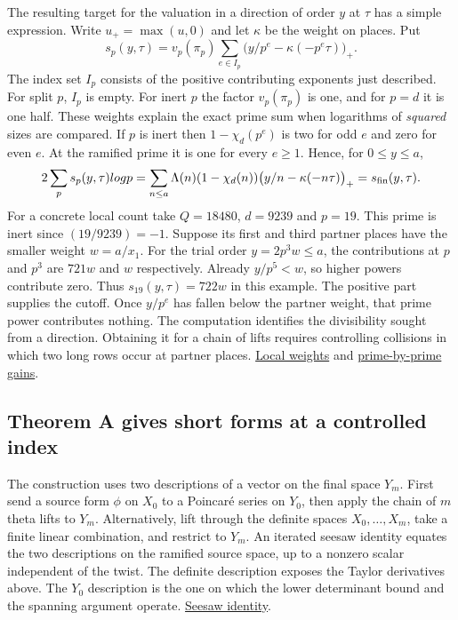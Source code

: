 \documentclass[11pt,letterpaper]{article}
\newcommand{\sref}[2]{\href{https://github.com/VladimirReshetnikov/ProveIt/blob/d8415e76ad850651f8c0083afe689dd9f4a45a10/Analysis/GeneralizedRiemannHypothesis/vendor/grh-lean/grh/src/#1.lean}{#2}}
\newcommand{\upperref}[2]{\sref{#1}{#2}}
\begin{document}
The resulting target for the valuation in a direction of order $y$ at $\tau$ has a simple expression. Write $u_+=\max(u,0)$ and let $\kappa$ be the weight on places. Put
\[
 s_p(y,\tau)=v_p(\pi_p)\sum_{e\in I_p}
             \bigl(y/p^e-\kappa(-p^e\tau)\bigr)_+.
\]
The index set $I_p$ consists of the positive contributing exponents just described. For split $p$, $I_p$ is empty. For inert $p$ the factor $v_p(\pi_p)$ is one, and for $p=d$ it is one half. These weights explain the exact prime sum when logarithms of \emph{squared} sizes are compared. If $p$ is inert then $1-\chi_d(p^e)$ is two for odd $e$ and zero for even $e$. At the ramified prime it is one for every $e\geq1$. Hence, for $0\leq y\leq a$,
\[
  2\sum_{p} s_p(y,\tau)\log p
  =\sum_{n\leq a}\Lambda(n)(1-\chi_d(n))
                  \bigl(y/n-\kappa(-n\tau)\bigr)_+
  =s_{\rm fin}(y,\tau).
\]
For a concrete local count take $Q=18480$, $d=9239$ and $p=19$. This prime is inert since $(19/9239)=-1$. Suppose its first and third partner places have the smaller weight $w=a/x_1$. For the trial order $y=2p^3w\le a$, the contributions at $p$ and $p^3$ are $721w$ and $w$ respectively. Already $y/p^5<w$, so higher powers contribute zero. Thus $s_{19}(y,\tau)=722w$ in this example. The positive part supplies the cutoff. Once $y/p^e$ has fallen below the partner weight, that prime power contributes nothing. The computation identifies the divisibility sought from a direction. Obtaining it for a chain of lifts requires controlling collisions in which two long rows occur at partner places. \upperref{Lib/CM/FormalGroup/PrimeNotation}{Local weights} and \upperref{New/UpperBound/Size/ShortColumns}{prime-by-prime gains}.

\subsection{Theorem A gives short forms at a controlled index}

The construction uses two descriptions of a vector on the final space $Y_m$. First send a source form $\phi$ on $X_0$ to a Poincar\'e series on $Y_0$, then apply the chain of $m$ theta lifts to $Y_m$. Alternatively, lift through the definite spaces $X_0,\ldots,X_m$, take a finite linear combination, and restrict to $Y_m$. An iterated seesaw identity equates the two descriptions on the ramified source space, up to a nonzero scalar independent of the twist. The definite description exposes the Taylor derivatives above. The $Y_0$ description is the one on which the lower determinant bound and the spanning argument operate. \upperref{New/UpperBound/Seesaw/SeesawIdentity}{Seesaw identity}.
\end{document}
